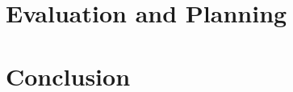 \documentclass[runningheads]{llncs}
\begin{document}


\section{Evaluation and Planning}
\label{sec:Evaluation and Planning}

\section{Conclusion}
\label{sec:Conclusion}


%
%

%
%
%
% 
% 
%


\end{document}
